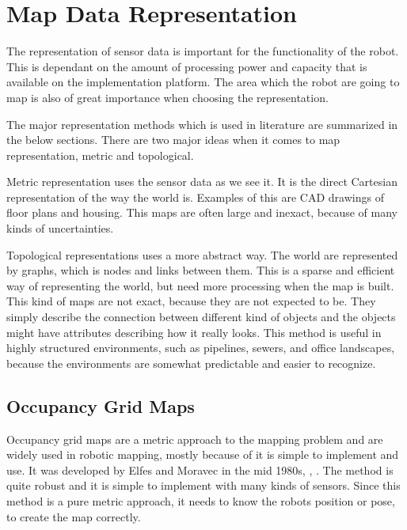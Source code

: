 \section{Map Data Representation}
\label{chap2:sec-representations}
The representation of sensor data is important for the functionality of the robot. This is
dependant on the amount of processing power and capacity that is available on the
implementation platform. 
The area which the robot are going to map is also of great importance when choosing the
representation. 

The major representation methods which is used in literature are summarized in the below
sections. There are two major ideas when it comes to map representation, 
metric and topological.

Metric representation uses the sensor data as we see it. It is the direct Cartesian
representation of the way the world is. Examples of this are CAD drawings of floor plans
and housing. This maps are often large and inexact, because of many kinds of
uncertainties.

Topological representations uses a more abstract way. The world are represented by graphs,
which is nodes and links between them. This is a sparse and efficient way of representing
the world, but need more processing when the map is built. This kind of maps are not
exact, because they are not expected to be. They simply describe the connection between
different kind of objects and the objects might have attributes describing how it really
looks. This method is useful in highly structured environments, such as pipelines, sewers,
and office landscapes, because the environments are somewhat predictable and easier to
recognize. 


\subsection{Occupancy Grid Maps}
Occupancy grid maps are a metric approach to the mapping problem and are widely used in 
robotic mapping, mostly because of it is simple to implement and use. It was developed 
by Elfes and Moravec in the mid 1980s, \cite{elfes}, \cite{moravec}. The method is quite 
robust and it is simple to implement with many kinds of sensors. Since this method is a
pure metric approach, it needs to know the robots position or pose, to create the map
correctly. 


